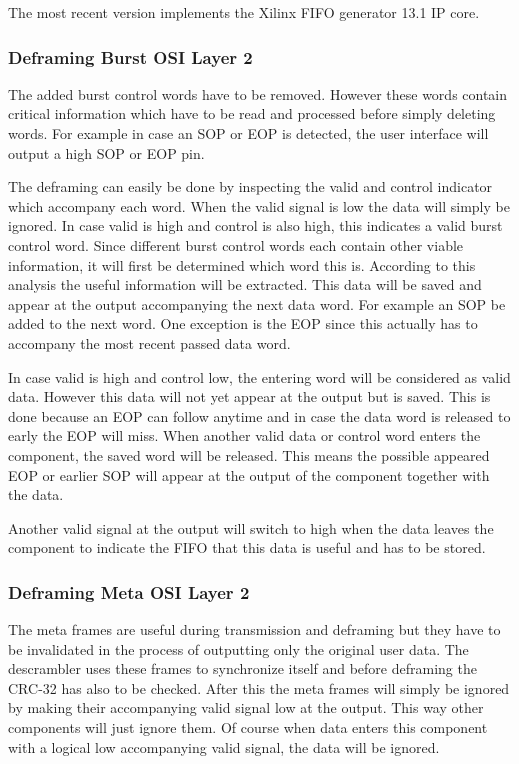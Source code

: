 		The most recent version implements the Xilinx FIFO generator 13.1 IP core.
	
	\subsubsection[Deframing Burst]{Deframing Burst \hfill OSI Layer 2}
		The added burst control words have to be removed. However these words contain critical information which have to be read and processed before simply deleting words. For example in case an SOP or EOP is detected, the user interface will output a high SOP or EOP pin.
		
		The deframing can easily be done by inspecting the valid and control indicator which accompany each word. When the valid signal is low the data will simply be ignored. In case valid is high and control is also high, this indicates a valid burst control word. Since different burst control words each contain other viable information, it will first be determined which word this is. According to this analysis the useful information will be extracted. This data will be saved and appear at the output accompanying the next data word. For example an SOP be added to the next word. One exception is the EOP since this actually has to accompany the most recent passed data word.
		
		In case valid is high and control low, the entering word will be considered as valid data. However this data will not yet appear at the output but is saved. This is done because an EOP can follow anytime and in case the data word is released to early the EOP will miss. When another valid data or control word enters the component, the saved word will be released. This means the possible appeared EOP or earlier SOP will appear at the output of the component together with the data.
		
		Another valid signal at the output will switch to high when the data leaves the component to indicate the FIFO that this data is useful and has to be stored.
		
	\subsubsection[Deframing Meta]{Deframing Meta \hfill OSI Layer 2}
		The meta frames are useful during transmission and deframing but they have to be invalidated in the process of outputting only the original user data. The descrambler uses these frames to synchronize itself and before deframing the CRC-32 has also to be checked. 
		After this the meta frames will simply be ignored by making their accompanying valid signal low at the output. This way other components will just ignore them. Of course when data enters this component with a logical low accompanying valid signal, the data will be ignored.
		
